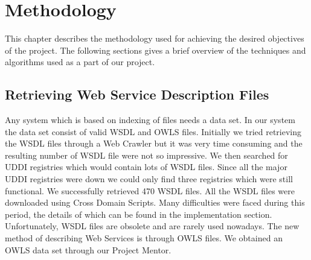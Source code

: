 \documentclass[12pt, twoside]{book}
\begin{document}
\chapter{Methodology}
This chapter describes the methodology used for achieving the desired objectives of the project. The following sections gives a brief overview of the techniques and algorithms used as a part of our project.

\section{Retrieving Web Service Description Files}
Any system which is based on indexing of files needs a data set. In our system the data set consist of valid WSDL and OWLS files. Initially we tried retrieving the WSDL files through a Web Crawler but it was very time consuming and the resulting number of WSDL file were not so impressive. We then searched for UDDI registries which would contain lots of WSDL files. Since all the major UDDI registries were down we could only find three registries which were still functional. We successfully retrieved 470 WSDL files. All the WSDL files were downloaded using Cross Domain Scripts. Many difficulties were faced during this period, the details of which can be found in the implementation section. Unfortunately, WSDL files are obsolete and are rarely used nowadays. The new method of describing Web Services is through OWLS files. We obtained an OWLS data set through our Project Mentor.
\end{document}
